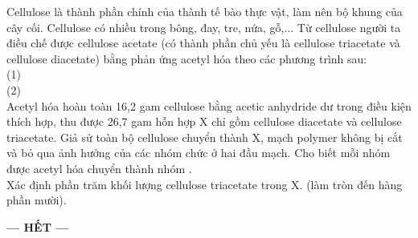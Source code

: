 \documentclass[11pt,a4paper]{article}
\begin{document}
\begin{ex}
Cellulose là thành phần chính của thành tế bào thực vật, làm nên bộ khung của cây cối. Cellulose có nhiều trong bông, đay, tre, nứa, gỗ,... Từ cellulose người ta điều chế được cellulose acetate (có thành phần chủ yếu là cellulose triacetate và cellulose diacetate) bằng phản ứng acetyl hóa theo các phương trình sau:\\
(1) \\
(2) \\
Acetyl hóa hoàn toàn 16,2 gam cellulose bằng acetic anhydride  dư trong điều kiện thích hợp, thu được 26,7 gam hỗn hợp X chỉ gồm cellulose diacetate và cellulose triacetate. Giả sử toàn bộ cellulose chuyển thành X, mạch polymer không bị cắt và bỏ qua ảnh hưởng của các nhóm chức ở hai đầu mạch. Cho biết mỗi nhóm  được acetyl hóa chuyển thành nhóm .\\
Xác định phần trăm khối lượng cellulose triacetate trong X. (làm tròn đến hàng phần mười).
\end{ex}

\begin{center}
\textbf{--- HẾT ---}
\end{center}
\end{document}
